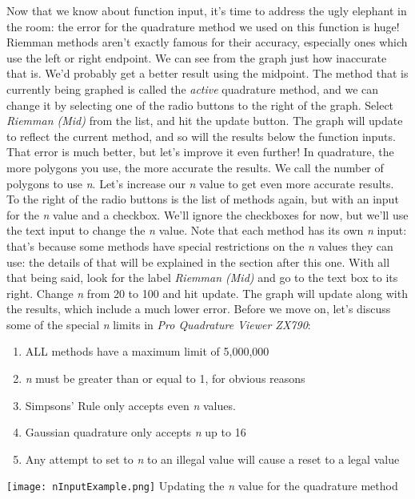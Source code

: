 \documentclass[12pt]{article}
\newcommand{\newLine}{\vspace{5mm}}
\newcommand{\appname}{\textit{Pro Quadrature Viewer ZX790}}
\begin{document}
\newLine Now that we know about function input, it's time to address the ugly elephant in the room: the error for the quadrature method we used on this function is huge! Riemman methods aren't exactly famous for their accuracy, especially ones which use the left or right endpoint. We can see from the graph just how inaccurate that is. We'd probably get a better result using the midpoint. The method that is currently being graphed is called the \emph{active} quadrature method, and we can change it by selecting one of the radio buttons to the right of the graph. Select \emph{Riemman (Mid)} from the list, and hit the update button. The graph will update to reflect the current method, and so will the results below the function inputs. That error is much better, but let's improve it even further! In quadrature, the more polygons you use, the more accurate the results. We call the number of polygons to use \emph{n}. Let's increase our \emph{n} value to get even more accurate results. To the right of the radio buttons is the list of methods again, but with an input for the \emph{n} value and a checkbox. We'll ignore the checkboxes for now, but we'll use the text input to change the \emph{n} value. Note that each method has its own \emph{n} input: that's because some methods have special restrictions on the \emph{n} values they can use: the details of that will be explained in the section after this one. With all that being said, look for the label \emph{Riemman (Mid)} and go to the text box to its right. Change \emph{n} from 20 to 100 and hit update. The graph will update along with the results, which include a much lower error. Before we move on, let's discuss some of the special \emph{n} limits in \appname :
\begin{enumerate}[\indent 1.]
\item ALL methods have a maximum limit of 5,000,000
\item \emph{n} must be greater than or equal to 1, for obvious reasons
\item Simpsons' Rule only accepts even \emph{n} values.
\item Gaussian quadrature only accepts \emph{n} up to 16
\item Any attempt to set to \emph{n} to an illegal value will cause a reset to a legal value
\end{enumerate}

\begin{center}
\texttt{[image: nInputExample.png]}
\small Updating the \emph{n} value for the quadrature method
\normalsize
\end{center}
\end{document}
